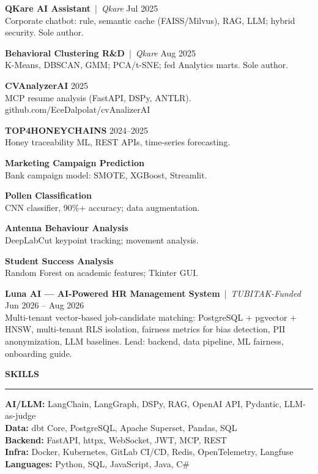 \documentclass[11pt,a4paper]{article}
\newcommand{\cvsection}[1]{%
  \vspace{1.2em}%
  {\large\textbf{\MakeUppercase{#1}}}\\[0.2em]
  \hrule
  \vspace{0.6em}%
}
\begin{document}
\textbf{QKare AI Assistant} \,|\, \textit{Qkare} \hfill Jul 2025\\
Corporate chatbot: rule, semantic cache (FAISS/Milvus), RAG, LLM; hybrid security. Sole author.
\vspace{0.5em}

\textbf{Behavioral Clustering R\&D} \,|\, \textit{Qkare} \hfill Aug 2025\\
K-Means, DBSCAN, GMM; PCA/t-SNE; fed Analytics marts. Sole author.
\vspace{0.5em}

\textbf{CVAnalyzerAI} \hfill 2025\\
MCP resume analysis (FastAPI, DSPy, ANTLR). github.com/EceDalpolat/cvAnalizerAI
\vspace{0.5em}

\textbf{TOP4HONEYCHAINS} \hfill 2024--2025\\
Honey traceability ML, REST APIs, time-series forecasting.
\vspace{0.5em}

\textbf{Marketing Campaign Prediction}\\
Bank campaign model: SMOTE, XGBoost, Streamlit.
\vspace{0.5em}

\textbf{Pollen Classification}\\
CNN classifier, 90\%+ accuracy; data augmentation.
\vspace{0.5em}

\textbf{Antenna Behaviour Analysis}\\
DeepLabCut keypoint tracking; movement analysis.
\vspace{0.5em}

\textbf{Student Success Analysis}\\
Random Forest on academic features; Tkinter GUI.
\vspace{0.5em}

\textbf{Luna AI --- AI-Powered HR Management System} \,|\, \textit{TUBITAK-Funded} \hfill Jun 2026 -- Aug 2026\\
Multi-tenant vector-based job-candidate matching: PostgreSQL + pgvector + HNSW, multi-tenant RLS isolation, fairness metrics for bias detection, PII anonymization, LLM baselines. Lead: backend, data pipeline, ML fairness, onboarding guide.

\cvsection{Skills}

\textbf{AI/LLM:} LangChain, LangGraph, DSPy, RAG, OpenAI API, Pydantic, LLM-as-judge\\[0.2em]
\textbf{Data:} dbt Core, PostgreSQL, Apache Superset, Pandas, SQL\\[0.2em]
\textbf{Backend:} FastAPI, httpx, WebSocket, JWT, MCP, REST\\[0.2em]
\textbf{Infra:} Docker, Kubernetes, GitLab CI/CD, Redis, OpenTelemetry, Langfuse\\[0.2em]
\textbf{Languages:} Python, SQL, JavaScript, Java, C\#
\end{document}
